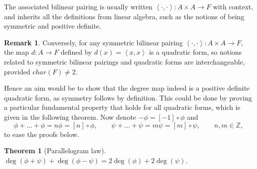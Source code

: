 \documentclass{article}
\newcommand{\Z}{\mathbb{Z}}
\newcommand{\rb}[1]{\left( #1 \right)}
\renewcommand{\sb}[1]{\left[ #1 \right]}
\newcommand{\ab}[1]{\left\langle #1 \right\rangle}
\theoremstyle{definition}\newtheorem*{definition}{Definition}
\theoremstyle{definition}\newtheorem*{example}{Example}
\theoremstyle{definition}\newtheorem*{remark}{Remark}
\newtheorem{theorem}[proposition]{Theorem}
\begin{document}
The associated bilinear pairing is usually written $ \ab{\cdot, \cdot} : A \times A \to F $ with context, and inherits all the definitions from linear algebra, such as the notions of being symmetric and positive definite.

\begin{remark}
Conversely, for any symmetric bilinear pairing $ \ab{\cdot, \cdot} : A \times A \to F $, the map $ d : A \to F $ defined by $ d\rb{x} = \ab{x, x} $ is a quadratic form, so notions related to symmetric bilinear pairings and quadratic forms are interchangeable, provided $ char\rb{F} \ne 2 $.
\end{remark}

Hence an aim would be to show that the degree map indeed is a positive definite quadratic form, as symmetry follows by definition. This could be done by proving a particular fundamental property that holds for all quadratic forms, which is given in the following theorem. Now denote $ -\phi = \sb{-1} \circ \phi $ and
$$ \phi + \dots + \phi = n\phi = \sb{n} \circ \phi, \qquad \psi + \dots + \psi = m\psi = \sb{m} \circ \psi, \qquad n, m \in \Z, $$
to ease the proofs below.

\begin{theorem}[Parallelogram law]
$ \deg\rb{\phi + \psi} + \deg\rb{\phi - \psi} = 2\deg\rb{\phi} + 2\deg\rb{\psi} $.
\end{theorem}
\end{document}
